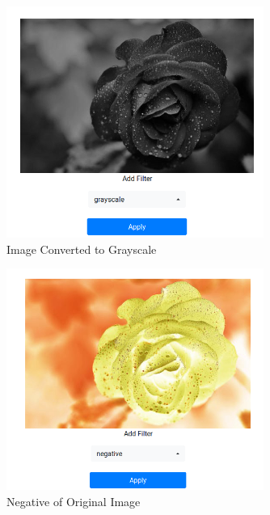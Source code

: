 \documentclass{article}
\begin{document}
  \begin{figure}[!htb]
    \centering
    \includegraphics[width=0.75\textwidth]{assets/grayscale.png}
    \caption{Image Converted to Grayscale}
    \label{fig:grayscale}
  \end{figure}

  \begin{figure}[!htb]
    \centering
    \includegraphics[width=0.75\textwidth]{assets/negative.png}
    \caption{Negative of Original Image}
    \label{fig:negative}
  \end{figure}
\end{document}
